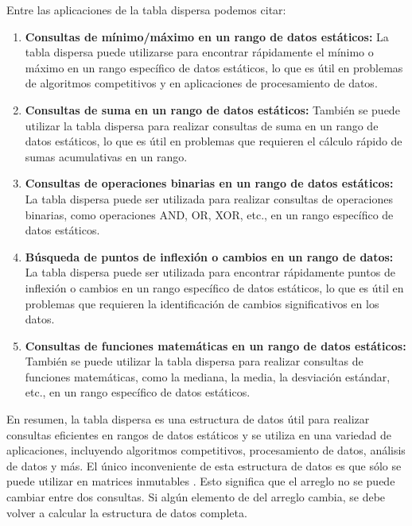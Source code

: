 Entre las aplicaciones de la tabla dispersa podemos citar:

\begin{enumerate}
	\item \textbf{Consultas de mínimo/máximo en un rango de datos estáticos:} La tabla dispersa puede utilizarse para encontrar rápidamente el mínimo o máximo en un rango específico de datos estáticos, lo que es útil en problemas de algoritmos competitivos y en aplicaciones de procesamiento de datos.
	
	\item \textbf{Consultas de suma en un rango de datos estáticos:} También se puede utilizar la tabla dispersa para realizar consultas de suma en un rango de datos estáticos, lo que es útil en problemas que requieren el cálculo rápido de sumas acumulativas en un rango.
	
	\item \textbf{Consultas de operaciones binarias en un rango de datos estáticos:} La tabla dispersa puede ser utilizada para realizar consultas de operaciones binarias, como operaciones AND, OR, XOR, etc., en un rango específico de datos estáticos.
	
	\item \textbf{Búsqueda de puntos de inflexión o cambios en un rango de datos:} La tabla dispersa puede ser utilizada para encontrar rápidamente puntos de inflexión o cambios en un rango específico de datos estáticos, lo que es útil en problemas que requieren la identificación de cambios significativos en los datos.
	
	\item \textbf{Consultas de funciones matemáticas en un rango de datos estáticos:} También se puede utilizar la tabla dispersa para realizar consultas de funciones matemáticas, como la mediana, la media, la desviación estándar, etc., en un rango específico de datos estáticos.
	
	
\end{enumerate}

En resumen, la tabla dispersa es una estructura de datos útil para realizar consultas eficientes en rangos de datos estáticos y se utiliza en una variedad de aplicaciones, incluyendo algoritmos competitivos, procesamiento de datos, análisis de datos y más. El único inconveniente de esta estructura de datos es que sólo se puede utilizar en matrices inmutables . Esto significa que el arreglo no se puede cambiar entre dos consultas. Si algún elemento de del arreglo cambia, se debe volver a calcular la estructura de datos completa.